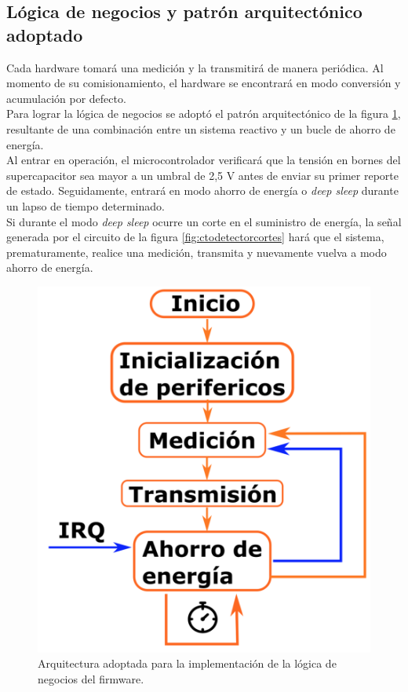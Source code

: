 \subsection{Lógica de negocios y patrón arquitectónico adoptado}
Cada hardware tomará una medición y la transmitirá de manera periódica. Al momento de su comisionamiento, el hardware se encontrará en modo conversión y acumulación por defecto.\\
Para lograr la lógica de negocios se adoptó el patrón arquitectónico de la figura \ref{fig:patronpowersaveloop}, resultante de una combinación entre un sistema reactivo y un bucle de ahorro de energía.\\
Al entrar en operación, el microcontrolador verificará que la tensión en bornes del supercapacitor sea mayor a un umbral de 2,5 V antes de enviar su primer reporte de estado. Seguidamente, entrará en modo ahorro de energía o \textit{deep sleep} durante un lapso de tiempo determinado.\\
Si durante el modo \textit{deep sleep} ocurre un corte en el suministro de energía, la señal generada por el circuito de la figura \ref{fig:ctodetectorcortes} hará que el sistema, prematuramente, realice una medición, transmita y nuevamente vuelva a modo ahorro de energía.\\
\begin{figure}[h!]
	\centering
	\includegraphics[width=0.7\linewidth]{Figures/patron_power_save_loop}
	\caption{Arquitectura adoptada para la implementación de la lógica de negocios del firmware.}
	\label{fig:patronpowersaveloop}
\end{figure}

